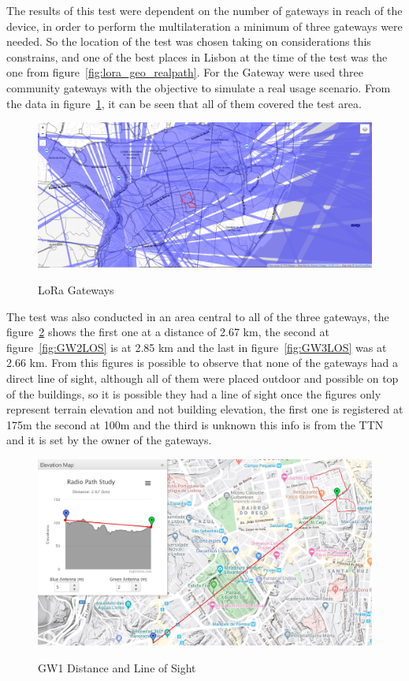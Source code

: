 The results of this test were dependent on the number of gateways in reach of the device, in order to perform the multilateration a minimum of three gateways were needed. So the location of the test was chosen taking on considerations this constrains, and one of the best places in Lisbon at the time of the test was the one from figure~\ref{fig:lora_geo_realpath}. For the Gateway were used three community gateways with the objective to simulate a real usage scenario. From the data in figure~\ref{fig:lora_geo_GWs}, it can be seen that all of them covered the test area. 

\begin{figure}[htbp]
  \centering
  
    {\includegraphics[width=0.8\linewidth]{Chapters/Figures/lorageoresttnmapperGWS.PNG}}%
 
  \caption{LoRa Gateways}
  \label{fig:lora_geo_GWs}
\end{figure}

The test was also conducted in an area central to all of the three gateways, the figure~\ref{fig:GW1LOS} shows the first one at a distance of 2.67 km, the second at figure~\ref{fig:GW2LOS} is at 2.85 km and the last in figure~\ref{fig:GW3LOS} was at 2.66 km. From this figures is possible to observe that none of the gateways had a direct line of sight, although all of them were placed outdoor and possible on top of the buildings, so it is possible they had a line of sight once the figures only represent terrain elevation and not building elevation, the first one is registered at 175m the second at 100m and the third is unknown this info is from the TTN~\cite{TTN} and it is set by the owner of the gateways.

\begin{figure}[htbp]
  \centering
       {\includegraphics[width=0.7\linewidth]{Chapters/Figures/GW1.JPG}}%
   \caption{GW1 Distance and Line of Sight}
  \label{fig:GW1LOS}
\end{figure}

